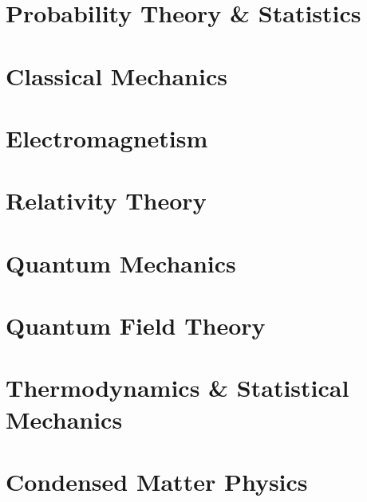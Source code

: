 \documentclass[11pt, a4paper]{report}
\begin{document}
\part{Probability Theory \& Statistics}


%

\part{Classical Mechanics}







\part{Electromagnetism}




\part{Relativity Theory}


\part{Quantum Mechanics}








\part{Quantum Field Theory}



%




\part{Thermodynamics \& Statistical Mechanics}



\part{Condensed Matter Physics}


\end{document}
